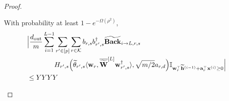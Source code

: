 \begin{claim}
\begin{proof}
				
				\begin{claim}
					With probability at least $1-e^{-\Omega(\rho^2)}$,
					\begin{align*}
						&\Big|\frac{\dout }{m} \sum_{i=1}^{L-1}  \sum_{r' \in [p]} \sum_{r \in \mathcal{K}}  b_{r, s} b_{r', s}^{\dagger} \widetilde{\mathbf{Back}}_{i \to L, r, s} \\& \quad \quad \quad \quad H_{r', s}\Big(\widetilde{\theta}_{r', s} \langle \mathbf{w}_{r}, \overline{\widetilde{\mathbf{W}}}^{[L]} \mathbf{w}_{r', s}^{\dagger}\rangle, \sqrt{m/2} a_{r, d}\Big) \mathbb{I}_{\mathbf{w}_r^{\top} \widetilde{\mathbf{h}}^{(i-1)} + \mathbf{a}_r^{\top} \mathbf{x}^{(i)} \ge 0}\Big| \\&
						\le YYYY%
					\end{align*}
				\end{claim}
				

\end{proof}
\end{claim}

